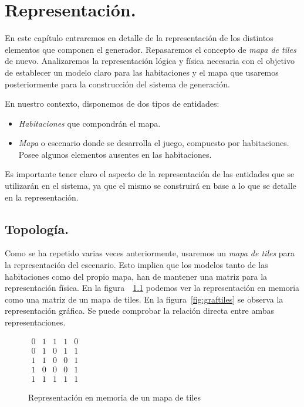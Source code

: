\chapter{Representación.}\label{cap:capitulo3}

En este capítulo entraremos en detalle de la representación de los distintos elementos que componen el generador. Repasaremos el concepto de \emph{mapa de tiles} de nuevo. Analizaremos la representación lógica y física necesaria con el objetivo de establecer un modelo claro para las habitaciones y el mapa que usaremos posteriormente para la construcción del sistema de generación.


En nuestro contexto, disponemos de dos tipos de entidades:

\begin{itemize}
	\item \emph{Habitaciones} que compondrán el mapa.
	\item \emph{Mapa} o escenario donde se desarrolla el juego, compuesto por habitaciones. Posee algunos elementos ausentes en las habitaciones.
\end{itemize}

Es importante tener claro el aspecto de la representación de las entidades que se utilizarán en el sistema, ya que el mismo se construirá en base a lo que se detalle en la representación.

\section{Topología.}

Como se ha repetido varias veces anteriormente, usaremos un \emph{mapa de tiles} para la representación del escenario. Esto implica que los modelos tanto de las habitaciones como del propio mapa, han de mantener una matriz para la representación física. En la figura~~\ref{fig:memtiles} podemos ver la representación en memoria como una matriz de un mapa de tiles. En la figura~\ref{fig:graftiles} se observa la representación gráfica. Se puede comprobar la relación directa entre ambas representaciones.


\begin{figure}[h]
\centering
{
	$
\begin{matrix}
	0 & 1 & 1 & 1 & 0 \\
	0 & 1 & 0 & 1 & 1 \\
	1 & 1 & 0 & 0 & 1 \\
	1 & 0 & 0 & 0 & 1 \\
	1 & 1 & 1 & 1 & 1
\end{matrix}
$
}
\caption{Representación en memoria de un mapa de tiles
\label{fig:memtiles}
}
\end{figure}

